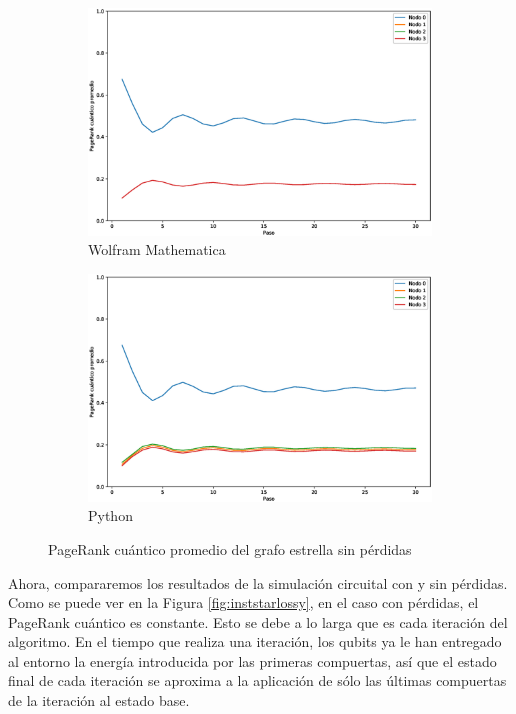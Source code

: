\begin{figure}[H]
    \centering
    \begin{subfigure}[m]{0.45\textwidth}
        \centering
        \includegraphics[width=0.9\linewidth]{img/star-mean-M.eps}
        \caption{Wolfram Mathematica}
    \end{subfigure}
    \begin{subfigure}[m]{0.45\textwidth}
        \centering
        \includegraphics[width=0.9\linewidth]{img/star-mean-lossless.eps}
        \caption{Python}
    \end{subfigure}
    \caption[PageRank cuántico promedio del grafo estrella sin pérdidas]{PageRank cuántico promedio del grafo estrella sin pérdidas}
    \label{fig:meanstarlossless}
\end{figure}

Ahora, compararemos los resultados de la simulación circuital con y sin pérdidas. Como se puede ver en la Figura \ref{fig:inststarlossy}, en el caso con pérdidas, el PageRank cuántico es constante. Esto se debe a lo larga que es cada iteración del algoritmo. En el tiempo que realiza una iteración, los qubits ya le han entregado al entorno la energía introducida por las primeras compuertas, así que el estado final de cada iteración se aproxima a la aplicación de sólo las últimas compuertas de la iteración al estado base.

